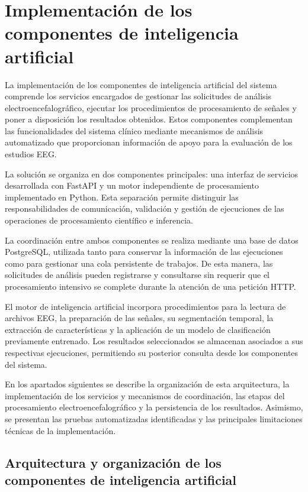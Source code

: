 \section{Implementación de los componentes de inteligencia artificial}

La implementación de los componentes de inteligencia artificial
del sistema comprende los servicios encargados de gestionar
las solicitudes de análisis electroencefalográfico, ejecutar
los procedimientos de procesamiento de señales y poner a
disposición los resultados obtenidos. Estos componentes
complementan las funcionalidades del sistema clínico mediante
mecanismos de análisis automatizado que proporcionan
información de apoyo para la evaluación de los estudios EEG.

La solución se organiza en dos componentes principales:
una interfaz de servicios desarrollada con FastAPI y un
motor independiente de procesamiento implementado en Python.
Esta separación permite distinguir las responsabilidades
de comunicación, validación y gestión de ejecuciones de
las operaciones de procesamiento científico e inferencia.

La coordinación entre ambos componentes se realiza mediante
una base de datos PostgreSQL, utilizada tanto para conservar
la información de las ejecuciones como para gestionar una
cola persistente de trabajos. De esta manera, las solicitudes
de análisis pueden registrarse y consultarse sin requerir
que el procesamiento intensivo se complete durante la
atención de una petición HTTP.

El motor de inteligencia artificial incorpora procedimientos
para la lectura de archivos EEG, la preparación de las señales,
su segmentación temporal, la extracción de características
y la aplicación de un modelo de clasificación previamente
entrenado. Los resultados seleccionados se almacenan
asociados a sus respectivas ejecuciones, permitiendo su
posterior consulta desde los componentes del sistema.

En los apartados siguientes se describe la organización
de esta arquitectura, la implementación de los servicios
y mecanismos de coordinación, las etapas del procesamiento
electroencefalográfico y la persistencia de los resultados.
Asimismo, se presentan las pruebas automatizadas
identificadas y las principales limitaciones técnicas
de la implementación.


\subsection{Arquitectura y organización de los componentes de inteligencia artificial}

